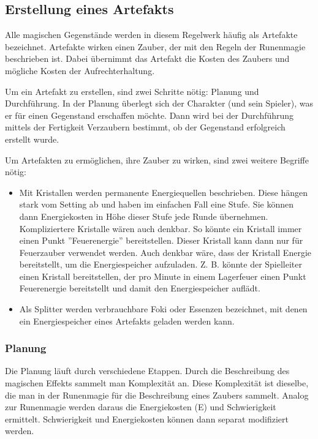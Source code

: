 \documentclass{article}
\begin{document}
\begin{center}
\subsection{Erstellung eines Artefakts}
\end{center}

Alle magischen Gegenstände werden in diesem Regelwerk häufig als Artefakte bezeichnet. Artefakte wirken einen Zauber,
der mit den Regeln der Runenmagie beschrieben ist. Dabei übernimmt das Artefakt die Kosten des Zaubers und mögliche
Kosten der Aufrechterhaltung.

Um ein Artefakt zu erstellen, sind zwei Schritte nötig: Planung und Durchführung. In der Planung überlegt sich der
Charakter (und sein Spieler), was er für einen Gegenstand erschaffen möchte. Dann wird bei der Durchführung mittels
der Fertigkeit Verzaubern bestimmt, ob der Gegenstand erfolgreich erstellt wurde.

Um Artefakten zu ermöglichen, ihre Zauber zu wirken, sind zwei weitere Begriffe nötig:

\begin{itemize}
\item Mit Kristallen werden permanente Energiequellen beschrieben. Diese hängen stark vom Setting ab und haben im einfachen Fall eine Stufe. Sie können dann Energiekosten in Höhe dieser Stufe jede Runde übernehmen. Kompliziertere Kristalle wären auch denkbar. So könnte ein Kristall immer einen Punkt ''Feuerenergie'' bereitstellen. Dieser Kristall kann dann nur für Feuerzauber verwendet werden. Auch denkbar wäre, dass der Kristall Energie bereitstellt, um die Energiespeicher aufzuladen. Z. B. könnte der Spielleiter einen Kristall bereitstellen, der pro Minute in einem Lagerfeuer einen Punkt Feuerenergie bereitstellt und damit den Energiespeicher auflädt.
\item Als Splitter werden verbrauchbare Foki oder Essenzen bezeichnet, mit denen ein Energiespeicher eines Artefakts geladen werden kann.
\end{itemize}

\subsubsection{Planung}

Die Planung läuft durch verschiedene Etappen. Durch die Beschreibung des magischen Effekts sammelt man Komplexität an.
Diese Komplexität ist dieselbe, die man in der Runenmagie für die Beschreibung eines Zaubers sammelt.
Analog zur Runenmagie werden daraus die Energiekosten (E) und Schwierigkeit ermittelt. Schwierigkeit und Energiekosten
können dann separat modifiziert werden.
\end{document}
